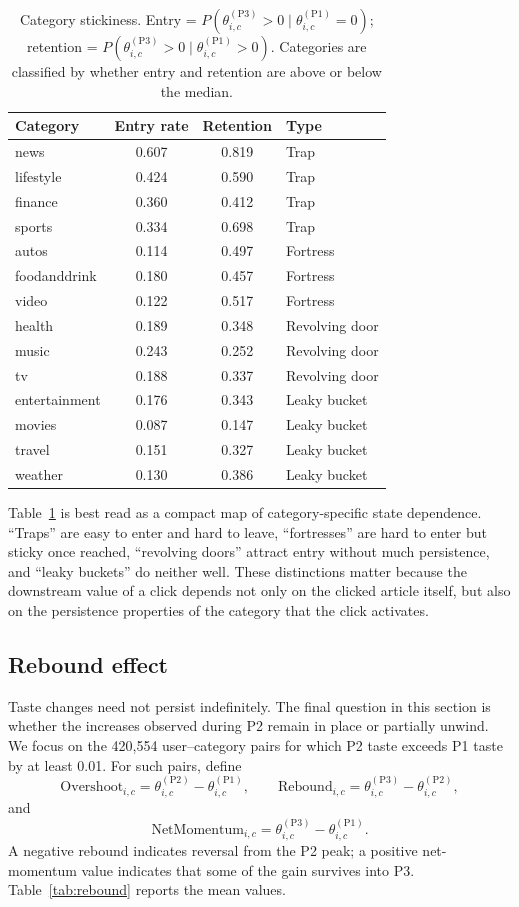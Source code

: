 \documentclass[11pt]{article}
\begin{document}
\begin{table}[ht]
\centering
\caption{Category stickiness. Entry = $P(\theta_{i,c}^{(\text{P3})} > 0 \mid \theta_{i,c}^{(\text{P1})} = 0)$; retention = $P(\theta_{i,c}^{(\text{P3})} > 0 \mid \theta_{i,c}^{(\text{P1})} > 0)$. Categories are classified by whether entry and retention are above or below the median.}
\label{tab:stickiness}
\begin{tabular}{lccl}
\toprule
Category & Entry rate & Retention & Type \\
\midrule
news & 0.607 & 0.819 & Trap \\
lifestyle & 0.424 & 0.590 & Trap \\
finance & 0.360 & 0.412 & Trap \\
sports & 0.334 & 0.698 & Trap \\
autos & 0.114 & 0.497 & Fortress \\
foodanddrink & 0.180 & 0.457 & Fortress \\
video & 0.122 & 0.517 & Fortress \\
health & 0.189 & 0.348 & Revolving door \\
music & 0.243 & 0.252 & Revolving door \\
tv & 0.188 & 0.337 & Revolving door \\
entertainment & 0.176 & 0.343 & Leaky bucket \\
movies & 0.087 & 0.147 & Leaky bucket \\
travel & 0.151 & 0.327 & Leaky bucket \\
weather & 0.130 & 0.386 & Leaky bucket \\
\bottomrule
\end{tabular}
\end{table}
\FloatBarrier

Table~\ref{tab:stickiness} is best read as a compact map of category-specific state dependence. ``Traps'' are easy to enter and hard to leave, ``fortresses'' are hard to enter but sticky once reached, ``revolving doors'' attract entry without much persistence, and ``leaky buckets'' do neither well. These distinctions matter because the downstream value of a click depends not only on the clicked article itself, but also on the persistence properties of the category that the click activates.

\subsection{Rebound effect}

Taste changes need not persist indefinitely. The final question in this section is whether the increases observed during P2 remain in place or partially unwind. We focus on the 420,554 user--category pairs for which P2 taste exceeds P1 taste by at least 0.01. For such pairs, define
\[
\text{Overshoot}_{i,c}
=
\theta_{i,c}^{(\mathrm{P2})}
-
\theta_{i,c}^{(\mathrm{P1})},
\qquad
\text{Rebound}_{i,c}
=
\theta_{i,c}^{(\mathrm{P3})}
-
\theta_{i,c}^{(\mathrm{P2})},
\]
and
\[
\text{NetMomentum}_{i,c}
=
\theta_{i,c}^{(\mathrm{P3})}
-
\theta_{i,c}^{(\mathrm{P1})}.
\]
A negative rebound indicates reversal from the P2 peak; a positive net-momentum value indicates that some of the gain survives into P3. Table~\ref{tab:rebound} reports the mean values.
\end{document}
